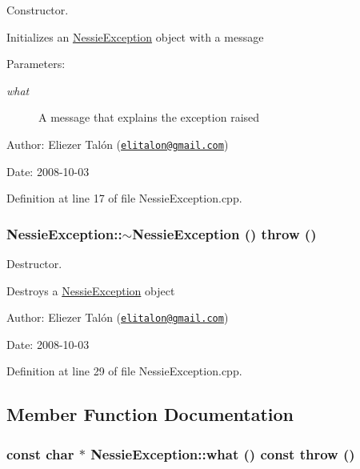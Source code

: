 Constructor. 

Initializes an \hyperlink{class_nessie_exception}{NessieException} object with a message

\begin{Desc}
\item[Parameters:]
\begin{description}
\item[{\em what}]A message that explains the exception raised\end{description}
\end{Desc}
\begin{Desc}
\item[Author:]Eliezer Talón (\href{mailto:elitalon@gmail.com}{\tt elitalon@gmail.com}) \end{Desc}
\begin{Desc}
\item[Date:]2008-10-03 \end{Desc}


Definition at line 17 of file NessieException.cpp.\hypertarget{class_nessie_exception_19f44d2725dd53e2f10505a88e5773f2}{
\subsubsection[$\sim$NessieException]{\setlength{\rightskip}{0pt plus 5cm}NessieException::$\sim$NessieException ()  throw ()}}
\label{class_nessie_exception_19f44d2725dd53e2f10505a88e5773f2}


Destructor. 

Destroys a \hyperlink{class_nessie_exception}{NessieException} object

\begin{Desc}
\item[Author:]Eliezer Talón (\href{mailto:elitalon@gmail.com}{\tt elitalon@gmail.com}) \end{Desc}
\begin{Desc}
\item[Date:]2008-10-03 \end{Desc}


Definition at line 29 of file NessieException.cpp.

\subsection{Member Function Documentation}
\hypertarget{class_nessie_exception_a522c2ea164e88be0b26670170b33909}{
\subsubsection[what]{\setlength{\rightskip}{0pt plus 5cm}const char $\ast$ NessieException::what () const  throw ()}}
\label{class_nessie_exception_a522c2ea164e88be0b26670170b33909}


